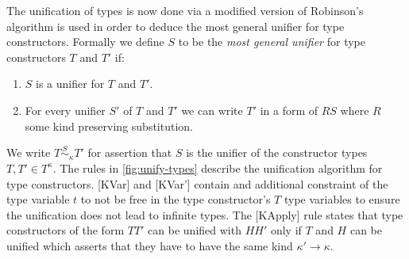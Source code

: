 The unification of types is now done via a modified version of Robinson's algorithm \citeyearpar{robinson_machine-oriented_1965}
is used in order to deduce the most general unifier for type constructors.
Formally we define $S$ to be the {\it most general unifier} for type constructors $T$ and $T'$ if:
\begin{enumerate}
  \item $S$ is a unifier for $T$ and $T'$.
  \item For every unifier $S'$ of $T$ and $T'$ we can write $T'$ in a form of
    $R S$ where $R$ some kind preserving substitution.
\end{enumerate}
We write $T \overset{S}{\sim}_{\kappa} T'$ for assertion that $S$ is the unifier
of the constructor types $T, T' \in T^{\kappa}$. The rules in \cref{fig:unify-types}
describe the unification algorithm for type constructors. [KVar] and [KVar'] contain
and additional constraint of the type variable $t$ to not be free in the type constructor's $T$
type variables to ensure the unification does not lead to infinite types. The [KApply] rule
states that type constructors of the form $T T'$ can be unified with $H H'$ only if $T$ and $H$
can be unified which asserts that they have to have the same kind $\kappa' \rightarrow \kappa$.

